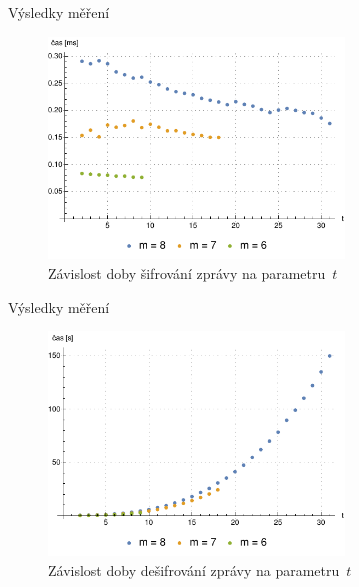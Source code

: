 \documentclass{beamer}
\begin{document}
\begin{frame}{Výsledky měření}

    \begin{figure}[!ht]
        \centering
        \includegraphics[width=0.7\textwidth]{../../implementace/grafy/listplot_m6-8_sifrovani.pdf}
        \caption[Časová složitost šifrování]{
            Závislost doby šifrování zprávy na parametru~$t$
        }
        \label{obr_mereni_t_sifr}
    \end{figure}

\end{frame}

\begin{frame}{Výsledky měření}

    \begin{figure}[!ht]
        \centering
        \includegraphics[width=0.7\textwidth]{../../implementace/grafy/listplot_m6-8_desifrovani.pdf}
        \caption[Časová složitost dešifrování]{
            Závislost doby dešifrování zprávy na parametru~$t$
        }
        \label{obr_mereni_t_desifr}
    \end{figure}

\end{frame}
\end{document}
